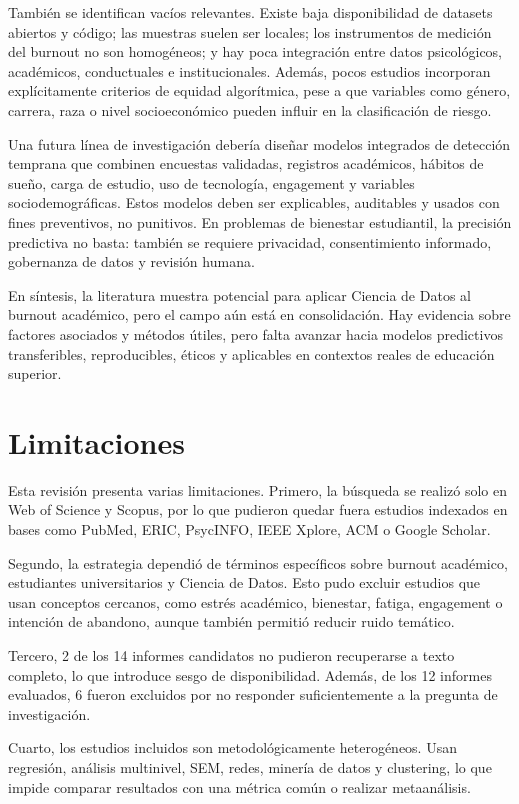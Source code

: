 \documentclass[12pt,a4paper]{article}
\begin{document}
También se identifican vacíos relevantes. Existe baja disponibilidad de datasets abiertos y código; las muestras suelen ser locales; los instrumentos de medición del burnout no son homogéneos; y hay poca integración entre datos psicológicos, académicos, conductuales e institucionales. Además, pocos estudios incorporan explícitamente criterios de equidad algorítmica, pese a que variables como género, carrera, raza o nivel socioeconómico pueden influir en la clasificación de riesgo.

Una futura línea de investigación debería diseñar modelos integrados de detección temprana que combinen encuestas validadas, registros académicos, hábitos de sueño, carga de estudio, uso de tecnología, engagement y variables sociodemográficas. Estos modelos deben ser explicables, auditables y usados con fines preventivos, no punitivos. En problemas de bienestar estudiantil, la precisión predictiva no basta: también se requiere privacidad, consentimiento informado, gobernanza de datos y revisión humana.

En síntesis, la literatura muestra potencial para aplicar Ciencia de Datos al burnout académico, pero el campo aún está en consolidación. Hay evidencia sobre factores asociados y métodos útiles, pero falta avanzar hacia modelos predictivos transferibles, reproducibles, éticos y aplicables en contextos reales de educación superior.

\section{Limitaciones}

Esta revisión presenta varias limitaciones. Primero, la búsqueda se realizó solo en Web of Science y Scopus, por lo que pudieron quedar fuera estudios indexados en bases como PubMed, ERIC, PsycINFO, IEEE Xplore, ACM o Google Scholar.

Segundo, la estrategia dependió de términos específicos sobre burnout académico, estudiantes universitarios y Ciencia de Datos. Esto pudo excluir estudios que usan conceptos cercanos, como estrés académico, bienestar, fatiga, engagement o intención de abandono, aunque también permitió reducir ruido temático.

Tercero, 2 de los 14 informes candidatos no pudieron recuperarse a texto completo, lo que introduce sesgo de disponibilidad. Además, de los 12 informes evaluados, 6 fueron excluidos por no responder suficientemente a la pregunta de investigación.

Cuarto, los estudios incluidos son metodológicamente heterogéneos. Usan regresión, análisis multinivel, SEM, redes, minería de datos y clustering, lo que impide comparar resultados con una métrica común o realizar metaanálisis.
\end{document}
